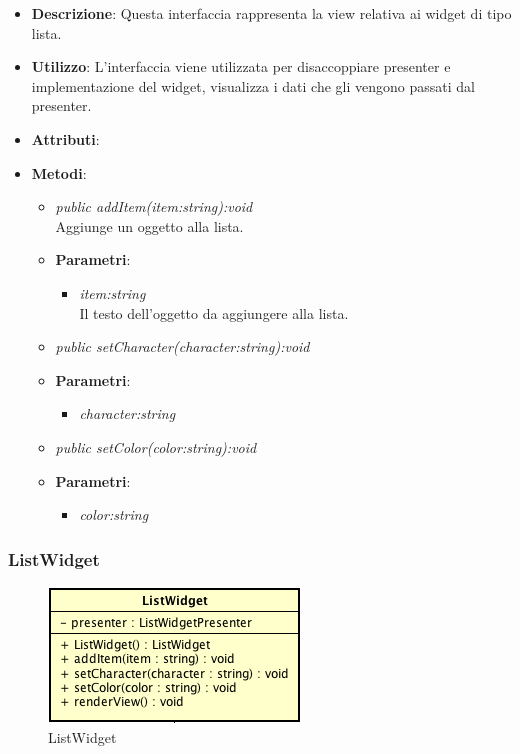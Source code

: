 \begin{itemize}
\item \textbf{Descrizione}: Questa interfaccia rappresenta la view relativa ai widget di tipo lista.
\item \textbf{Utilizzo}: L'interfaccia viene utilizzata per disaccoppiare presenter e implementazione del widget, visualizza i dati che gli vengono passati dal presenter.
\item \textbf{Attributi}:
\item \textbf{Metodi}:
	\begin{itemize}
	\item \textit{public addItem(item:string):void}\\
	Aggiunge un oggetto alla lista.
		\item{\textbf{Parametri}: \begin{itemize}
		\item \textit{item:string}\\
		Il testo dell'oggetto da aggiungere alla lista.
		\end{itemize}}
	\item \textit{public setCharacter(character:string):void}\\

		\item{\textbf{Parametri}: \begin{itemize}
		\item \textit{character:string}\\

		\end{itemize}}
	\item \textit{public setColor(color:string):void}\\

		\item{\textbf{Parametri}: \begin{itemize}
		\item \textit{color:string}\\

		\end{itemize}}
	\end{itemize}
\end{itemize}

\subsubsection{ListWidget}

\label{ListWidget}
\begin{figure}[ht]
	\centering
	\includegraphics[scale=0.5]{Sezioni/SottosezioniST/img/ListWidget.png}
	\caption{ListWidget}
\end{figure}

